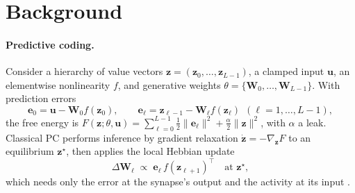 \documentclass[10pt]{article}
\theoremstyle{remark}
\newcommand{\bz}{\mathbf{z}}
\newcommand{\bW}{\mathbf{W}}
\newcommand{\bu}{\mathbf{u}}
\newcommand{\grad}{\nabla}
\newcommand{\half}{\tfrac{1}{2}}
\begin{document}
\section{Background}
\label{sec:background}

\paragraph{Predictive coding.} Consider a hierarchy of value vectors
$\bz=(\bz_0,\dots,\bz_{L-1})$, a clamped input $\bu$, an elementwise
nonlinearity $f$, and generative weights $\theta=\{\bW_0,\dots,\bW_{L-1}\}$.
With prediction errors
\begin{equation}
\label{eq:errors}
\mathbf{e}_0 = \bu - \bW_0 f(\bz_0), \qquad
\mathbf{e}_\ell = \bz_{\ell-1} - \bW_\ell f(\bz_\ell)\ \ (\ell=1,\dots,L-1),
\end{equation}
the free energy is
$F(\bz;\theta,\bu)=\sum_{\ell=0}^{L-1}\half\|\mathbf{e}_\ell\|^2
+\tfrac{\alpha}{2}\|\bz\|^2$,
with $\alpha$ a leak. Classical PC performs inference by gradient
relaxation $\dot{\bz}=-\grad_{\bz}F$ to an equilibrium $\bz^\star$, then
applies the local Hebbian update
\begin{equation}
\label{eq:pc_hebb}
\Delta \bW_\ell \;\propto\; \mathbf{e}_\ell\, f(\bz_{\ell+1})^{\!\top}
\quad\text{at } \bz^\star,
\end{equation}
which needs only the error at the synapse's output and the activity at its
input \citep{raoballard,whittingtonbogacz}.
\end{document}
